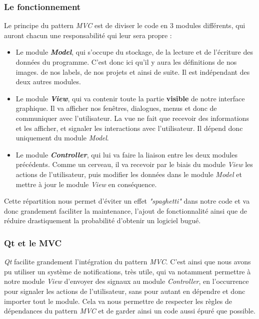\documentclass{rapport}
\begin{document}
            \subsubsection{Le fonctionnement}
            Le principe du pattern \textit{MVC} est de diviser le code en 3 modules différents, qui auront chacun une responsabilité qui leur sera propre : 
            
            \begin{itemize}
                \item Le module \textbf{\textit{Model}}, qui s'occupe du stockage, de la lecture et de l'écriture des données du programme. C'est donc ici qu'il y aura les définitions de nos images. de nos labels, de nos projets et ainsi de suite. Il est indépendant des deux autres modules.

                \item Le module \textbf{\textit{View}}, qui va contenir toute la partie \textbf{visible} de notre interface graphique. Il va afficher nos fenêtres, dialogues, menus et donc de communiquer avec l'utilisateur. La vue ne fait que recevoir des informations et les afficher, et signaler les interactions avec l'utilisateur. Il dépend donc uniquement du module \textit{Model}.

                \item Le module \textbf{\textit{Controller}}, qui lui va faire la liaison entre les deux modules précédents. Comme un cerveau, il va recevoir par le biais du module \textit{View} les actions de l'utilisateur, puis modifier les données dans le module \textit{Model} et mettre à jour le module \textit{View} en conséquence.  
            \end{itemize}
            
            Cette répartition nous permet d'éviter un effet \textit{"spaghetti"} dans notre code et va donc grandement faciliter la maintenance, l'ajout de fonctionnalité ainsi que de réduire drastiquement la probabilité d'obtenir un logiciel bugué.
            
            \subsubsection{Qt et le MVC}
            \textit{Qt} facilite grandement l'intégration du pattern \textit{MVC}. C'est ainsi que nous avons pu utiliser un système de notifications, très utile, qui va notamment permettre à notre module \textit{View} d'envoyer des signaux au module \textit{Controller}, en l'occurrence pour signaler les actions de l'utilisateur, sans pour autant en dépendre et donc importer tout le module. Cela va nous permettre de respecter les règles de dépendances du pattern \textit{MVC} et de garder ainsi un code aussi épuré que possible.
            
\end{document}
